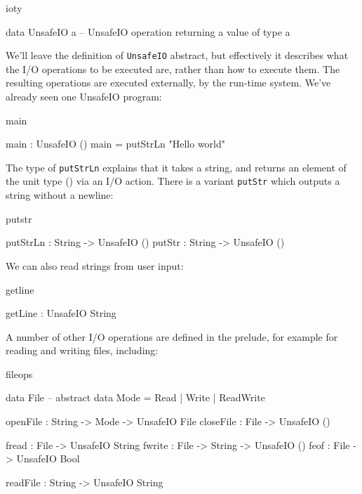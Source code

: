 \begin{SaveVerbatim}{ioty}

data UnsafeIO a -- UnsafeIO operation returning a value of type a

\end{SaveVerbatim}

\noindent
We'll leave the definition of \texttt{UnsafeIO} abstract, but effectively it describes what
the I/O operations to be executed are, rather than how to execute them. The
resulting operations are executed externally,
by the run-time system. We've already seen one UnsafeIO
program:

\begin{SaveVerbatim}{main}

main : UnsafeIO ()
main = putStrLn "Hello world"

\end{SaveVerbatim}

\noindent
The type of \texttt{putStrLn} explains that it takes a string, and returns an
element of the unit type () via an I/O action. There is a variant \texttt{putStr} which
outputs a string without a newline:

\begin{SaveVerbatim}{putstr}

putStrLn : String -> UnsafeIO ()
putStr   : String -> UnsafeIO ()

\end{SaveVerbatim}

We can also read strings from user input:

\begin{SaveVerbatim}{getline}

getLine : UnsafeIO String

\end{SaveVerbatim}

\noindent
A number of other I/O operations are defined in the prelude, for example for reading and
writing files, including:

\begin{SaveVerbatim}{fileops}

data File -- abstract
data Mode = Read | Write | ReadWrite

openFile  : String -> Mode -> UnsafeIO File
closeFile : File -> UnsafeIO ()

fread  : File -> UnsafeIO String
fwrite : File -> String -> UnsafeIO ()
feof   : File -> UnsafeIO Bool

readFile : String -> UnsafeIO String

\end{SaveVerbatim}

